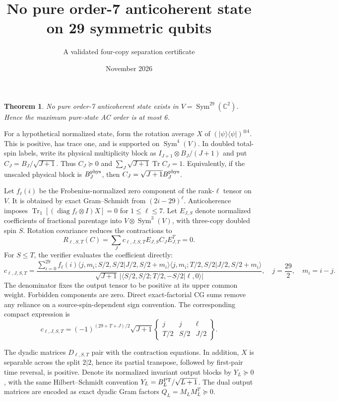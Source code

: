 \documentclass[11pt]{article}
\newtheorem{theorem}{Theorem}
\newcommand{\Tr}{\operatorname{Tr}}
\begin{document}
\title{No pure order-7 anticoherent state on 29 symmetric qubits}
\author{A validated four-copy separation certificate}\date{November 2026}\maketitle
\begin{theorem}No pure order-7 anticoherent state exists in $V=\operatorname{Sym}^{29}(\mathbb C^2)$. Hence the maximum pure-state AC order is at most 6.\end{theorem}
For a hypothetical normalized state, form the rotation average $X$ of $(|\psi\rangle\langle\psi|)^{\otimes4}$. This is positive, has trace one, and is supported on $\operatorname{Sym}^4(V)$. In doubled total-spin labels, write its physical multiplicity block as $I_{J+1}\otimes B_J/(J+1)$ and put $C_J=B_J/\sqrt{J+1}$. Thus $C_J\succeq0$ and $\sum_J\sqrt{J+1}\Tr C_J=1$. Equivalently, if the unscaled physical block is $B_J^{\rm phys}$, then $C_J=\sqrt{J+1}B_J^{\rm phys}$.

Let $f_\ell(i)$ be the Frobenius-normalized zero component of the rank-$\ell$ tensor on $V$. It is obtained by exact Gram--Schmidt from $(2i-29)^\ell$. Anticoherence imposes $\Tr_1[(\operatorname{diag}f_\ell\otimes I)X]=0$ for $1\le\ell\le 7$. Let $E_{J,S}$ denote normalized coefficients of fractional parentage into $V\otimes\operatorname{Sym}^3(V)$, with three-copy doubled spin $S$. Rotation covariance reduces the contractions to
\[
 R_{\ell,S,T}(C)=\sum_Jc_{\ell,J,S,T}E_{J,S}C_JE_{J,T}^T=0.
\]
For $S\le T$, the verifier evaluates the coefficient directly:
\[
 c_{\ell,J,S,T}=\frac{\sum_{i=0}^{29}f_\ell(i)
 \langle j,m_i;S/2,S/2|J/2,S/2+m_i\rangle
 \langle j,m_i;T/2,S/2|J/2,S/2+m_i\rangle}
 {\sqrt{J+1}\,|\langle S/2,S/2;T/2,-S/2|\ell,0\rangle|},
 \quad j=\frac{29}{2},\quad m_i=i-j.
\]
The denominator fixes the output tensor to be positive at its upper common weight. Forbidden components are zero. Direct exact-factorial CG sums remove any reliance on a source-spin-dependent sign convention. The corresponding compact expression is
\[
 c_{\ell,J,S,T}=(-1)^{(29+T+J)/2}\sqrt{J+1}
 \begin{Bmatrix}j&j&\ell\\T/2&S/2&J/2\end{Bmatrix}.
\]

The dyadic matrices $D_{\ell,S,T}$ pair with the contraction equations. In addition, $X$ is separable across the split $2|2$, hence its partial transpose, followed by first-pair time reversal, is positive. Denote its normalized invariant output blocks by $Y_L\succeq0$, with the same Hilbert--Schmidt convention $Y_L=B^{\rm PT}_L/\sqrt{L+1}$. The dual output matrices are encoded as exact dyadic Gram factors $Q_L=M_LM_L^T\succeq0$.
\end{document}
